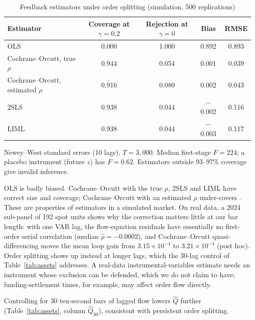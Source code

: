 \begin{table}[t]\centering
\begin{threeparttable}
\caption{Feedback estimators under order splitting (simulation, 500 replications)}\label{tab:iv}
\begin{tabular}{lcccc}
\toprule
Estimator & Coverage at $\gamma=0.2$ & Rejection at $\gamma=0$ & Bias & RMSE\\
\midrule
OLS & 0.000 & 1.000 & 0.892 & 0.893\\
Cochrane--Orcutt, true $\rho$ & 0.944 & 0.054 & 0.001 & 0.039\\
Cochrane--Orcutt, estimated $\rho$ & 0.916 & 0.080 & 0.002 & 0.043\\
2SLS & 0.938 & 0.044 & $-$0.002 & 0.116\\
LIML & 0.938 & 0.044 & $-$0.003 & 0.117\\
\bottomrule
\end{tabular}
\begin{tablenotes}\footnotesize\item Newey--West standard errors (10 lags), $T=3{,}000$. Median first-stage $F=224$; a placebo instrument (future $z$) has $F=0.62$. Estimators outside 93--97\% coverage give invalid inference. \end{tablenotes}
\end{threeparttable}
\end{table}

OLS is badly biased. Cochrane--Orcutt with the true $\rho$, 2SLS and LIML have correct size and coverage; Cochrane--Orcutt with an estimated $\rho$ under-covers \citep{cochrane1949,staiger1997}. These are properties of estimators in a simulated market. On real data, a 2024 sub-panel of 192 spot units shows why the correction matters little at our bar length: with one VAR lag, the flow-equation residuals have essentially no first-order serial correlation (median $\hat\rho=-0.0002$), and Cochrane--Orcutt quasi-differencing moves the mean loop gain from $3.15\times10^{-4}$ to $3.21\times10^{-4}$ (post hoc). Order splitting shows up instead at longer lags, which the 30-lag control of Table~\ref{tab:assets} addresses. A real-data instrumental-variables estimate needs an instrument whose exclusion can be defended, which we do not claim to have; funding-settlement times, for example, may affect order flow directly.

Controlling for 30 ten-second bars of lagged flow lowers $\hat Q$ further (Table~\ref{tab:assets}, column $\hat Q_{30}$), consistent with persistent order splitting.

